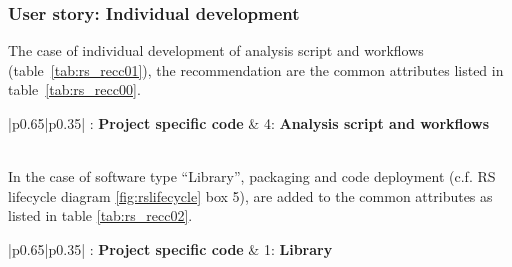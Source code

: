 \subsubsection{User story: Individual development}

The case of individual development of analysis script and workflows (table~\ref{tab:rs_recc01}), the recommendation are the common attributes listed in table~\ref{tab:rs_recc00}.

\begin{center}
    \tabletail{\hline}
    \label{tab:rs_recc01}
    \small
    \begin{supertabular}{|p{0.65\linewidth}|p{0.35\linewidth}|} : \textbf{Project specific code} &
    4: \textbf{Analysis script and workflows} \\ \hline \hline
     \\ \hline

\end{supertabular}
\end{center}

In the case of software type ``Library'', packaging and code deployment (c.f. RS lifecycle diagram \ref{fig:rslifecycle} box 5), are added to the common attributes as listed in table \ref{tab:rs_recc02}.

\begin{center}
    \tabletail{\hline}
    \label{tab:rs_recc02}
    \small
    \begin{supertabular}{|p{0.65\linewidth}|p{0.35\linewidth}|} : \textbf{Project specific code} &
    1: \textbf{Library} \\ \hline \hline

     \\ \hline
     \\ \hline
     \\ \hline

\end{supertabular}
\end{center}

